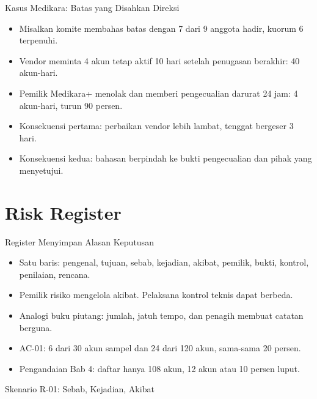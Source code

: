 \documentclass[aspectratio=169, table, 12pt]{beamer}
\begin{document}
\begin{frame}{{\Large Kasus Medikara: Batas yang Disahkan Direksi}}
  \vspace{6pt}
  \small
  \begin{itemize}
    \item Misalkan komite membahas batas dengan 7 dari 9 anggota hadir, kuorum 6 terpenuhi.
    \item Vendor meminta 4 akun tetap aktif 10 hari setelah penugasan berakhir: 40 akun-hari.
    \item Pemilik Medikara+ menolak dan memberi pengecualian darurat 24 jam: 4 akun-hari, turun 90
          persen.
    \item Konsekuensi pertama: perbaikan vendor lebih lambat, tenggat bergeser 3 hari.
    \item Konsekuensi kedua: bahasan berpindah ke bukti pengecualian dan pihak yang menyetujui.
  \end{itemize}
\end{frame}

\section{Risk Register}

\begin{frame}{{\Large Register Menyimpan Alasan Keputusan}}
  \vspace{6pt}
  \small
  \begin{itemize}
    \item Satu baris: pengenal, tujuan, sebab, kejadian, akibat, pemilik, bukti, kontrol, penilaian,
          rencana.
    \item Pemilik risiko mengelola akibat. Pelaksana kontrol teknis dapat berbeda.
    \item Analogi buku piutang: jumlah, jatuh tempo, dan penagih membuat catatan berguna.
    \item AC-01: 6 dari 30 akun sampel dan 24 dari 120 akun, sama-sama 20 persen.
    \item Pengandaian Bab 4: daftar hanya 108 akun, 12 akun atau 10 persen luput.
  \end{itemize}
\end{frame}

\begin{frame}{{\Large Skenario R-01: Sebab, Kejadian, Akibat}}
  \centering
  \vspace{8pt}
  \resizebox{\textwidth}{!}{}
\end{frame}
\end{document}
